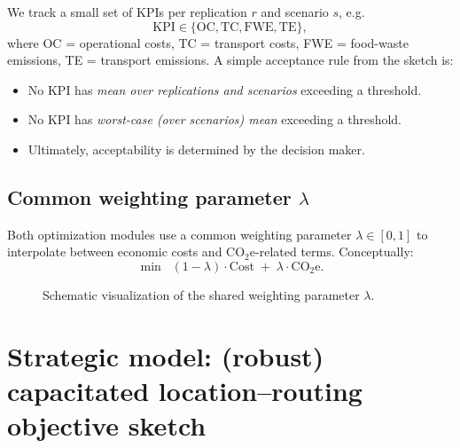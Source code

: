 \documentclass[11pt,a4paper]{article}
\begin{document}
We track a small set of KPIs per replication $r$ and scenario $s$, e.g.
\[
\text{KPI} \in \{\text{OC}, \text{TC}, \text{FWE}, \text{TE}\},
\]
where OC = operational costs, TC = transport costs, FWE = food-waste emissions, TE = transport emissions.
A simple acceptance rule from the sketch is:
\begin{itemize}[leftmargin=1.4em]
\item No KPI has \emph{mean over replications and scenarios} exceeding a threshold.
\item No KPI has \emph{worst-case (over scenarios) mean} exceeding a threshold.
\item Ultimately, acceptability is determined by the decision maker.
\end{itemize}

\subsection{Common weighting parameter $\lambda$}

Both optimization modules use a common weighting parameter $\lambda\in[0,1]$ to interpolate between
economic costs and CO$_2$e-related terms. Conceptually:
\begin{equation}
  \min\;\; (1-\lambda)\cdot \text{Cost} \;+\; \lambda\cdot \text{CO$_2$e}.
  \label{eq:lambda-weight}
\end{equation}

\begin{figure}[t]
\centering
{}
\caption{Schematic visualization of the shared weighting parameter $\lambda$.}
\label{fig:lambda}
\end{figure}

\section{Strategic model: (robust) capacitated location--routing objective sketch}
\end{document}
